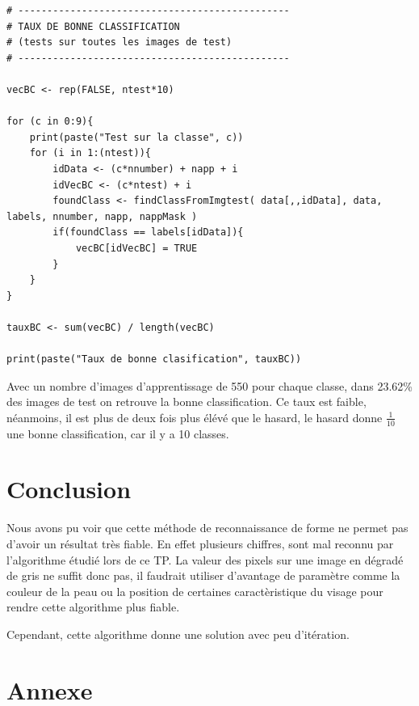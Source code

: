\documentclass[a4paper,11pt]{article}
\begin{document}
  \begin{lstlisting}[caption=Taux de bonne classification]
# -----------------------------------------------
# TAUX DE BONNE CLASSIFICATION
# (tests sur toutes les images de test)
# -----------------------------------------------

vecBC <- rep(FALSE, ntest*10)

for (c in 0:9){
    print(paste("Test sur la classe", c))
    for (i in 1:(ntest)){
        idData <- (c*nnumber) + napp + i
        idVecBC <- (c*ntest) + i
        foundClass <- findClassFromImgtest( data[,,idData], data, labels, nnumber, napp, nappMask )
        if(foundClass == labels[idData]){
            vecBC[idVecBC] = TRUE
        }
    }
}

tauxBC <- sum(vecBC) / length(vecBC)

print(paste("Taux de bonne clasification", tauxBC))
  \end{lstlisting}
  
  Avec un nombre d'images d'apprentissage de 550 pour chaque classe, dans 23.62\% des images de test
  on retrouve la bonne classification. Ce taux est faible, néanmoins, il est plus de deux fois plus élévé 
  que le hasard, le hasard donne $\frac{1}{10}$ une bonne classification, car il y a 10 classes.
  
  \section{Conclusion}
  Nous avons pu voir que cette méthode de reconnaissance de forme ne permet pas d'avoir un résultat
  très fiable. En effet plusieurs chiffres, sont mal reconnu par l'algorithme étudié lors de ce TP.
  La valeur des pixels sur une image en dégradé de gris ne suffit donc pas, il faudrait utiliser 
  d'avantage de paramètre comme la couleur de la peau ou la position de certaines caractèristique du visage
  pour rendre cette algorithme plus fiable.
  
  Cependant, cette algorithme donne une solution avec peu d'itération.
  
  \newpage
  
  \section{Annexe}
  
\end{document}
